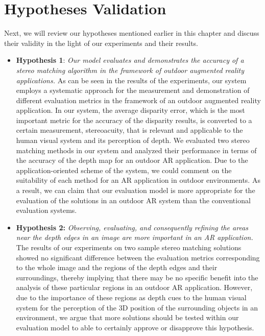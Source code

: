 \section{Hypotheses Validation}
Next, we will review our hypotheses mentioned earlier in this chapter and discuss their validity in the light of our experiments and their results.

\begin{itemize}
\item \textbf{Hypothesis 1}: \emph{Our model evaluates and demonstrates the accuracy of a stereo matching algorithm in the framework of 
outdoor augmented reality applications.} 
As can be seen in the results of the experiments, our system employs a systematic approach for the measurement and demonstration of different 
evaluation metrics in the framework of an outdoor augmented reality application. 
In our system, the average disparity error, which is the most important metric for the accuracy of the disparity results, 
is converted to a certain measurement, stereoacuity, that is relevant and applicable to the human visual
system and its perception of depth. We evaluated two stereo matching methods in our system and analyzed their performance in terms of
the accuracy of the depth map for an outdoor AR application. Due to the application-oriented scheme of the system, we could comment on the suitability of each method
for an AR application in outdoor environments. As a result, we can claim that our evaluation model is more appropriate for the evaluation of the solutions 
in an outdoor AR system than the conventional evaluation systems.

\item \textbf{Hypothesis 2:} \emph{Observing, evaluating, and consequently 
refining the areas near the depth edges in an image are more important in an AR application.}
The results of our experiments on two sample stereo matching solutions showed no significant difference between the evaluation metrics corresponding to the whole image and
the regions of the depth edges and their surroundings, thereby implying that there may be no specific benefit into the analysis of these particular regions 
in an outdoor AR application.
However, due to the importance of these regions as depth cues to the human visual system for the perception of the 3D position of the surrounding 
objects in an environment, we argue that more solutions should be tested within our evaluation model 
to able to certainly approve or disapprove this hypothesis. 


\end{itemize}
